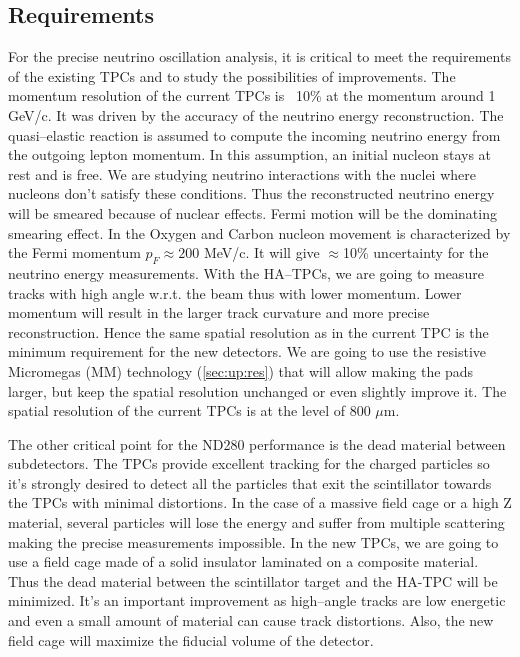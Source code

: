 \documentclass[../main.tex]{subfiles}
\begin{document}
\subsection{Requirements}
For the precise neutrino oscillation analysis, it is critical to meet the requirements of the existing TPCs and to study the possibilities of improvements. The momentum resolution of the current TPCs is ~10\% at the momentum around 1 GeV/c. It was driven by the accuracy of the neutrino energy reconstruction. The quasi--elastic reaction is assumed to compute the incoming neutrino energy from the outgoing lepton momentum. In this assumption, an initial nucleon stays at rest and is free. We are studying neutrino interactions with the nuclei where nucleons don't satisfy these conditions. Thus the reconstructed neutrino energy will be smeared because of nuclear effects. Fermi motion will be the dominating smearing effect. In the Oxygen and Carbon nucleon movement is characterized by the Fermi momentum $p_F\approx 200$ MeV/c. It will give $\approx$10\% uncertainty for the neutrino energy measurements. With the HA--TPCs, we are going to measure tracks with high angle w.r.t. the beam thus with lower momentum. Lower momentum will result in the larger track curvature and more precise reconstruction. Hence the same spatial resolution as in the current TPC is the minimum requirement for the new detectors. We are going to use the resistive Micromegas (MM) technology (\autoref{sec:up:res}) that will allow making the pads larger, but keep the spatial resolution unchanged or even slightly improve it. The spatial resolution of the current TPCs is at the level of 800 $\mu\text{m}$.

The other critical point for the ND280 performance is the dead material between subdetectors. The TPCs provide excellent tracking for the charged particles so it's strongly desired to detect all the particles that exit the scintillator towards the TPCs with minimal distortions. In the case of a massive field cage or a high Z material, several particles will lose the energy and suffer from multiple scattering making the precise measurements impossible. In the new TPCs, we are going to use a field cage made of a solid insulator laminated on a composite material. Thus the dead material between the scintillator target and the HA-TPC will be minimized. It's an important improvement as high--angle tracks are low energetic and even a small amount of material can cause track distortions. Also, the new field cage will maximize the fiducial volume of the detector.
\end{document}
